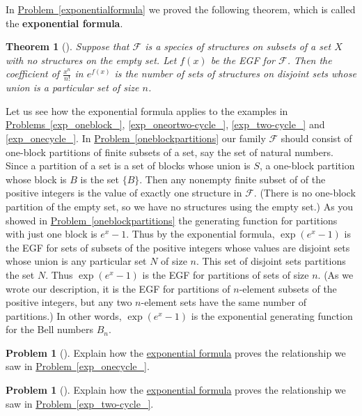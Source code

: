 \documentclass[10pt,]{book}
\newcommand{\terminology}[1]{\textbf{#1}}
\theoremstyle{plain}
\newtheorem{theorem}{Theorem}[section]
\theoremstyle{definition}
\newtheorem{activity}[project]{Problem}
\theoremstyle{definition}
\numberwithin{equation}{chapter}
\newcommand{\F}{\mathcal{F}}
\begin{document}
In \hyperref[exponentialformula]{Problem~\ref{exponentialformula}} we proved the following theorem, which is called the \terminology{exponential formula}.%
\begin{theorem}[{}]\label{exponentialformulathm}
Suppose that \(\F\) is a species of structures on subsets of a set \(X\) with no structures on the empty set. Let \(f(x)\) be the EGF for \(\F\). Then the coefficient of \(\frac{x^n}{n!}\) in \(e^{f(x)}\) is the number of sets of structures on disjoint sets whose union is a particular set of size \(n\).%
\end{theorem}
Let us see how the exponential formula applies to the examples in \hyperref[exp_oneblock_]{Problems~\ref{exp_oneblock_}}, \hyperref[exp_oneortwo-cycle_]{\ref{exp_oneortwo-cycle_}}, \hyperref[exp_two-cycle_]{\ref{exp_two-cycle_}} and \hyperref[exp_onecycle_]{\ref{exp_onecycle_}}. In \hyperref[oneblockpartitions]{Problem~\ref{oneblockpartitions}} our family \(\F\) should consist of one-block partitions of finite subsets of a set, say the set of natural numbers.  Since a partition of a set is a set of blocks whose union is \(S\), a one-block partition whose block is \(B\) is the set \(\{B\}\). Then any nonempty finite subset of of the positive integers is the value of exactly one structure in \(\F\).  (There is no one-block partition of the empty set, so we have no structures using the empty set.) As you showed in \hyperref[oneblockpartitions]{Problem~\ref{oneblockpartitions}} the generating function for partitions with just one block is \(e^x-1\). Thus by the exponential formula, \(\exp(e^x-1)\) is the EGF for sets of subsets of the positive integers whose values are disjoint sets whose union is any particular set \(N\) of size \(n\). This set of disjoint sets partitions the set \(N\). Thus \(\exp(e^x-1)\) is the EGF for partitions of sets of size \(n\). (As we wrote our description, it is the EGF for partitions of \(n\)-element subsets of the positive integers, but any two \(n\)-element sets have the same number of partitions.) In other words, \(\exp(e^x-1)\) is the exponential generating function for the Bell numbers \(B_n\).%
\begin{activity}[] \label{activity-414}
Explain how the \hyperref[exponentialformulathm]{exponential formula} proves the relationship we saw in \hyperref[exp_onecycle_]{Problem~\ref{exp_onecycle_}}.%
\end{activity}
\begin{activity}[] \label{activity-415}
Explain how the \hyperref[exponentialformulathm]{exponential formula} proves the relationship we saw in \hyperref[exp_two-cycle_]{Problem~\ref{exp_two-cycle_}}.%
\end{activity}
\end{document}
